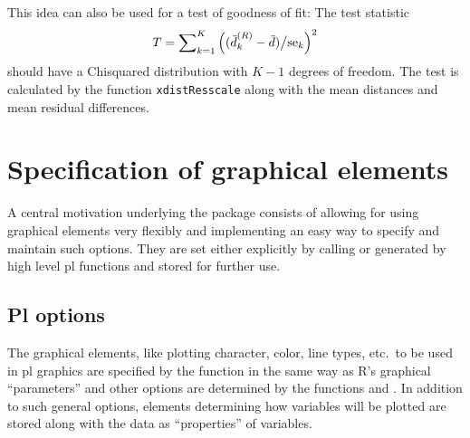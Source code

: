 \documentclass[11pt]{article}\usepackage[]{graphicx}\usepackage[]{color}
\begin{document}
This idea can also be used for a test of goodness of fit: The test
statistic 
$$
  T = \sum\nolimits_{k=1}^K \left((\wb d\sups R_k-\wb d)\big/\mbox{se}_k\right)^2
$$
should have a Chisquared distribution with $K-1$ degrees of freedom.
The test is calculated by the function \texttt{xdistResscale} along with
the mean distances and mean residual differences.

\section{Specification of graphical elements}
A central motivation underlying the  package consists of
allowing for using graphical elements very flexibly and implementing an
easy way to specify and maintain such options.
They are set either explicitly by calling  or generated
by high level pl functions and stored for further use.

\subsection{Pl options}
The graphical elements, like plotting character, color, line types, etc.\ 
to be used in pl graphics are specified by the function 
in the same way as R's graphical ``parameters'' and other options are 
determined by the functions \T{par} and \T{options}.
In addition to such general options, 
elements determining how variables will be plotted are stored along 
with the data as ``properties'' of variables.
\end{document}
